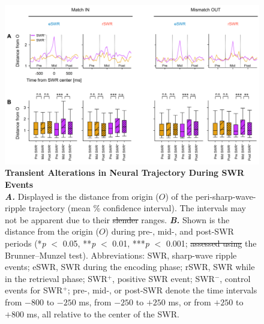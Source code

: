 \documentclass[final,3p,times,twocolumn]{elsarticle}
\providecommand{\DIFaddtex}[1]{{\protect\color{blue}\uwave{#1}}} %
\providecommand{\DIFdeltex}[1]{{\protect\color{red}\sout{#1}}}                      %
\providecommand{\DIFaddFL}[1]{\DIFadd{#1}} %
\providecommand{\DIFdelFL}[1]{\DIFdel{#1}} %
\providecommand{\DIFaddbeginFL}{} %
\providecommand{\DIFaddendFL}{} %
\providecommand{\DIFdelbeginFL}{} %
\providecommand{\DIFdelendFL}{} %
\providecommand{\DIFadd}[1]{\texorpdfstring{\DIFaddtex{#1}}{#1}} %
\providecommand{\DIFdel}[1]{\texorpdfstring{\DIFdeltex{#1}}{}} %
\newcommand{\DIFscaledelfig}{0.5}
\newlength{\DIFdelgraphicswidth} %
\newlength{\DIFdelgraphicsheight} %
\newcommand{\DIFaddincludegraphics}[2][]{{\color{blue}\fbox{\DIFOincludegraphics[#1]{#2}}}} %
\newcommand{\DIFdelincludegraphics}[2][]{%
\sbox{\DIFdelgraphicsbox}{\DIFOincludegraphics[#1]{#2}}%
\settoboxwidth{\DIFdelgraphicswidth}{\DIFdelgraphicsbox} %
\settoboxtotalheight{\DIFdelgraphicsheight}{\DIFdelgraphicsbox} %
\scalebox{\DIFscaledelfig}{%
\parbox[b]{\DIFdelgraphicswidth}{\usebox{\DIFdelgraphicsbox}\\[-\baselineskip] \rule{\DIFdelgraphicswidth}{0em}}\llap{\resizebox{\DIFdelgraphicswidth}{\DIFdelgraphicsheight}{%
\setlength{\unitlength}{\DIFdelgraphicswidth}%
\begin{picture}(1,1)%
\thicklines\linethickness{2pt} %
{\color[rgb]{1,0,0}\put(0,0){\framebox(1,1){}}}%
{\color[rgb]{1,0,0}\put(0,0){\line( 1,1){1}}}%
{\color[rgb]{1,0,0}\put(0,1){\line(1,-1){1}}}%
\end{picture}%
}\hspace*{3pt}}} %
} %
\DeclareRobustCommand{\DIFaddbeginFL}{\DIFOaddbeginFL \let\includegraphics\DIFaddincludegraphics} %
\DeclareRobustCommand{\DIFaddendFL}{\DIFOaddendFL \let\includegraphics\DIFOincludegraphics} %
\DeclareRobustCommand{\DIFdelbeginFL}{\DIFOdelbeginFL \let\includegraphics\DIFdelincludegraphics} %
\DeclareRobustCommand{\DIFdelendFL}{\DIFOaddendFL \let\includegraphics\DIFOincludegraphics} %
\begin{document}
        \clearpage
        \begin{figure}[ht]
        	\centering
            \includegraphics[width=1\textwidth]{./src/figures/.png/Figure_ID_05.png}
        	\caption{\textbf{
Transient Alterations in Neural Trajectory During SWR Events
}
\smallskip
\\
\textbf{\textit{A.}} Displayed is the distance from origin ($O$) of the peri-sharp-wave-ripple trajectory (mean \% confidence interval). The intervals may not be apparent due to their \DIFdelbeginFL \DIFdelFL{slender }\DIFdelendFL \DIFaddbeginFL \DIFaddFL{narrow }\DIFaddendFL ranges. \textbf{\textit{B.}} Shown is the distance from the origin ($O$) during pre-, mid-, and post-SWR periods (*\textit{p} $<$ 0.05, **\textit{p} $<$ 0.01, ***\textit{p} $<$ 0.001; \DIFdelbeginFL \DIFdelFL{assessed using }\DIFdelendFL the Brunner--Munzel test). Abbreviations: SWR, sharp-wave ripple events; eSWR, SWR during the encoding phase; rSWR, SWR while in the retrieval phase; SWR$^+$, positive SWR event; SWR$^-$, control events for SWR$^+$; pre-, mid-, or post-SWR denote the time intervals from $-800$ to $-250$ ms, from $-250$ to $+250$ ms, or from $+250$ to $+800$ ms, all relative to the center of the SWR.
}
        	\label{fig:05}
        \end{figure}
        \clearpage
\end{document}
